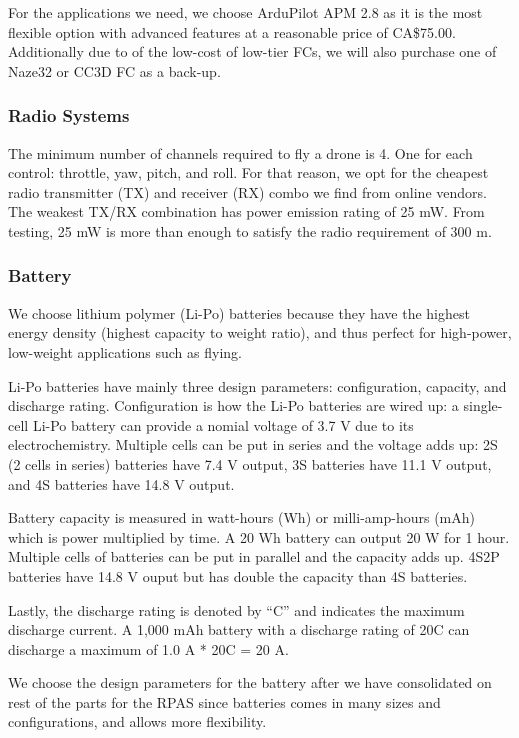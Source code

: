 For the applications we need, we choose ArduPilot APM 2.8 as it is the most flexible option with advanced features at a reasonable price of CA\$75.00. Additionally due to of the low-cost of low-tier FCs, we will also purchase one of Naze32 or CC3D FC as a back-up.

\subsubsection{Radio Systems}

The minimum number of channels required to fly a drone is 4. One for each control: throttle, yaw, 
pitch, and roll. For that reason, we opt for the cheapest radio transmitter (TX) and receiver  (RX) 
combo we find from online vendors. The weakest TX/RX combination has power emission rating of 25 mW. 
From testing, 25 mW is more than enough to satisfy the radio requirement of 300 m.

\subsubsection{Battery}

We choose lithium polymer (Li-Po) batteries because they have the highest energy density (highest 
capacity to weight ratio), and thus perfect for high-power, low-weight applications such as flying. 

Li-Po batteries have mainly three design parameters: configuration, capacity, and discharge rating. 
Configuration is how the Li-Po batteries are wired up: a single-cell Li-Po battery can provide a 
nomial voltage of 3.7 V due to its electrochemistry. Multiple cells can be put in series and the 
voltage adds up: 2S (2 cells in series) batteries have 7.4 V output, 3S batteries have 11.1 V output,
 and 4S batteries have 14.8 V output.

Battery capacity is measured in watt-hours (Wh) or milli-amp-hours (mAh) which is power multiplied by time. A 20 Wh battery can output 20 W for 1 hour. Multiple cells of batteries can be put in parallel and the capacity adds up. 4S2P batteries have 14.8 V ouput but has double the capacity than 4S batteries.

Lastly, the discharge rating is denoted by “C” and indicates the maximum discharge current. A 1,000 
mAh battery with a discharge rating of 20C can discharge a maximum of 1.0 A * 20C = 20 A.

We choose the design parameters for the battery after we have consolidated on rest of the parts for the RPAS since batteries comes in many sizes and configurations, and allows more flexibility.
